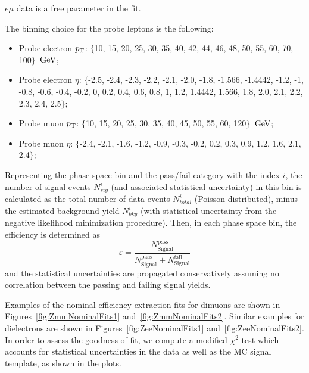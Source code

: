 {\ensuremath{e\mu} data is a free parameter in the fit.

The binning choice for the probe leptons is the following:
\begin{itemize}
\item Probe electron $p_{\mathrm{T}}$: $\{$10, 15, 20, 25, 30, 35, 40, 42, 44, 46, 48, 50, 55, 60, 70, 100$\}$ $\,\text{Ge\hspace{-.08em}V}$;
\item Probe electron $\eta$: $\{$-2.5, -2.4, -2.3, -2.2, -2.1, -2.0, -1.8, -1.566, -1.4442, -1.2, -1, -0.8, -0.6, -0.4, -0.2, 0, 0.2, 0.4, 0.6, 0.8, 1, 1.2, 1.4442, 1.566, 1.8, 2.0, 2.1, 2.2, 2.3, 2.4, 2.5$\}$;
\item Probe muon $p_{\mathrm{T}}$: $\{$10, 15, 20, 25, 30, 35, 40, 45, 50, 55, 60, 120$\}$ $\,\text{Ge\hspace{-.08em}V}$;
\item Probe muon $\eta$: $\{$-2.4, -2.1, -1.6, -1.2, -0.9, -0.3, -0.2, 0.2, 0.3, 0.9, 1.2, 1.6, 2.1, 2.4$\}$;
\end{itemize}

Representing the phase space bin and the pass/fail category with the index $i$,
the number of signal events $N_{sig}^{i}$ (and associated statistical uncertainty) in this bin
is calculated as the total number of data events $N_{total}^{i}$ (Poisson distributed),
minus the estimated background yield $N_{bkg}^{i}$
(with statistical uncertainty from the negative likelihood minimization procedure).
Then, in each phase space bin, the efficiency is determined as
\begin{equation}
  \varepsilon = \frac{N_{\mathrm{Signal}}^{\mathrm{pass}}}{N_{\mathrm{Signal}}^{\mathrm{pass}}+N_{\mathrm{Signal}}^{\mathrm{fail}}}
\end{equation}
and the statistical uncertainties are propagated conservatively assuming no correlation between the passing and failing signal yields.

Examples of the nominal efficiency extraction fits for dimuons are shown in Figures~\ref{fig:ZmmNominalFits1} and~\ref{fig:ZmmNominalFits2}.
Similar examples for dielectrons are shown in Figures~\ref{fig:ZeeNominalFits1} and~\ref{fig:ZeeNominalFits2}.
In order to assess the goodness-of-fit, we compute a modified $\chi^2$ test which accounts for
statistical uncertainties in the data as well as the MC signal template, as shown in the plots.

}
